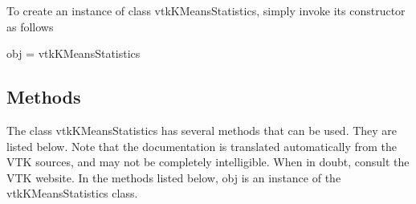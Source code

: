 To create an instance of class vtk\-K\-Means\-Statistics, simply invoke its constructor as follows \begin{DoxyVerb}  obj = vtkKMeansStatistics
\end{DoxyVerb}
 \hypertarget{vtkwidgets_vtkxyplotwidget_Methods}{}\subsection{Methods}\label{vtkwidgets_vtkxyplotwidget_Methods}
The class vtk\-K\-Means\-Statistics has several methods that can be used. They are listed below. Note that the documentation is translated automatically from the V\-T\-K sources, and may not be completely intelligible. When in doubt, consult the V\-T\-K website. In the methods listed below, {\ttfamily obj} is an instance of the vtk\-K\-Means\-Statistics class. 
